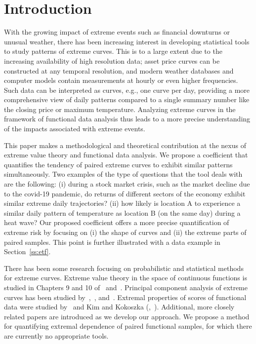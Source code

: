 \documentclass[lineno]{biometrika}
\begin{document}
\section{Introduction}
With the growing impact of extreme events such as financial downturns or unusual weather, there has been increasing interest in developing statistical tools to study patterns of extreme curves. This is to a large extent due to the increasing availability of high resolution data; asset price curves can be constructed at any temporal resolution, and modern weather databases and computer models contain measurements at hourly or even higher frequencies. Such data can be interpreted as curves, e.g., one curve per day, providing a more comprehensive view of daily patterns compared to a single summary number like the closing price or maximum temperature. Analyzing extreme curves in the framework of functional data analysis thus leads to a more precise understanding of the impacts associated with extreme events.

This paper makes a methodological and theoretical contribution at the nexus of extreme value theory and functional data analysis. We propose a coefficient that quantifies the tendency of paired extreme curves to exhibit similar patterns simultaneously. Two examples of the type of questions that the tool deals with are the following: (i) during a stock market crisis, such as the market decline  due to the covid-19 pandemic, do
returns  of  different sectors of the economy exhibit similar extreme daily trajectories? (ii) how likely is location A to experience  a similar daily pattern of temperature  as location B (on the same day)  during a heat wave? Our proposed coefficient offers a more precise quantification of extreme risk by focusing on (i) the shape of curves and (ii) the extreme parts of paired samples. This point is further illustrated with a data example in Section~\ref{ss:etf}.

There has been some research focusing on probabilistic and
statistical methods for extreme curves.
Extreme value theory in the space of continuous functions is
studied in Chapters 9 and 10 of~\citet{deHaan:ferreira:2000} and~\citet{einmahl:segers:2021}.
Principal component analysis of extreme curves has been studied by~\citet{kokoszka:stoev:xiong:2019},~\citet{kokoszka:kulik:2023}, and~\citet{clemenccon:huet:sabourin:2023}. Extremal properties of scores of functional data were studied by~\citet{kokoszka:xiong:2018} and Kim and Kokoszka (\citeyear{kim:kokoszka:2019},~\citeyear{kim:kokoszka:2023b}).
Additional,  more closely related papers are introduced as we
develop our approach.
We propose a method for quantifying extremal dependence of paired functional samples, for which there are currently no appropriate tools.
\end{document}
